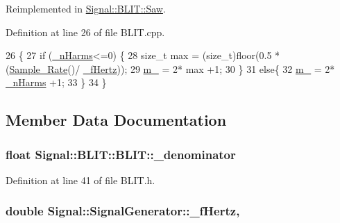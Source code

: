 Reimplemented in \hyperlink{classSignal_1_1BLIT_1_1Saw_af6d7dce56eb43701f024bb2bc15515fd}{Signal\+::\+B\+L\+I\+T\+::\+Saw}.



Definition at line 26 of file B\+L\+I\+T.\+cpp.


\begin{DoxyCode}
26                                 \{
27     \textcolor{keywordflow}{if} (\hyperlink{classSignal_1_1BLIT_1_1BLIT_a0bfbf4e7515a42fab7df748b8497f648}{\_nHarms}<=0) \{
28         \textcolor{keywordtype}{size\_t} max = (size\_t)floor(0.5 * (\hyperlink{namespaceSignal_ae7b1f222afc010e0f33f306f978fcde9}{Sample\_Rate}()/ \hyperlink{classSignal_1_1SignalGenerator_a85a4702347352bab1c71e0a8df8437d6}{\_fHertz}));
29         \hyperlink{classSignal_1_1BLIT_1_1BLIT_a314aae37a0a53fa3f79a4466b9558fa5}{m\_} = 2* max +1;
30     \}
31     \textcolor{keywordflow}{else}\{
32         \hyperlink{classSignal_1_1BLIT_1_1BLIT_a314aae37a0a53fa3f79a4466b9558fa5}{m\_} = 2* \hyperlink{classSignal_1_1BLIT_1_1BLIT_a0bfbf4e7515a42fab7df748b8497f648}{\_nHarms} +1;
33     \}
34 \}\end{DoxyCode}


\subsection{Member Data Documentation}
\hypertarget{classSignal_1_1BLIT_1_1BLIT_abef50d7ff7da92f5f0a8482287b47ae5}{
\subsubsection[{\+\_\+denominator}]{\setlength{\rightskip}{0pt plus 5cm}float Signal\+::\+B\+L\+I\+T\+::\+B\+L\+I\+T\+::\+\_\+denominator\hspace{0.3cm}{\ttfamily [protected]}}}\label{classSignal_1_1BLIT_1_1BLIT_abef50d7ff7da92f5f0a8482287b47ae5}


Definition at line 41 of file B\+L\+I\+T.\+h.

\hypertarget{classSignal_1_1SignalGenerator_a85a4702347352bab1c71e0a8df8437d6}{
\subsubsection[{\+\_\+f\+Hertz}]{\setlength{\rightskip}{0pt plus 5cm}double Signal\+::\+Signal\+Generator\+::\+\_\+f\+Hertz\hspace{0.3cm}{\ttfamily [protected]}, {\ttfamily [inherited]}}}\label{classSignal_1_1SignalGenerator_a85a4702347352bab1c71e0a8df8437d6}


